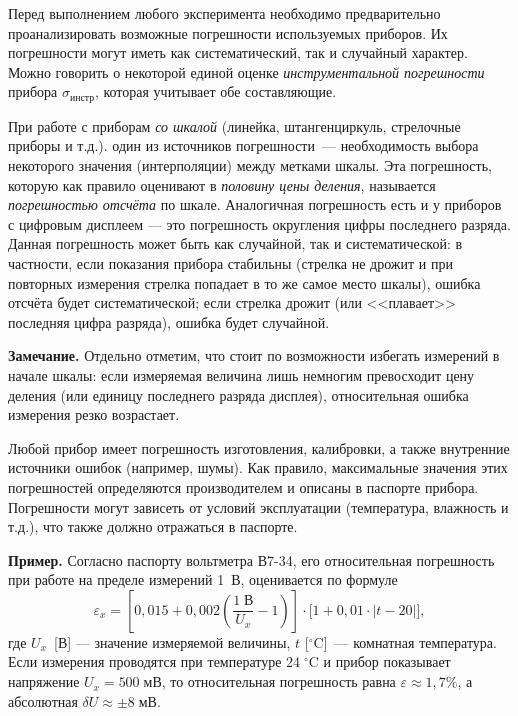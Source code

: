 Перед выполнением любого эксперимента необходимо предварительно проанализировать
возможные погрешности используемых приборов. Их погрешности могут
иметь как систематический, так и случайный характер. Можно говорить
о некоторой единой оценке \emph{инструментальной погрешности} прибора
$\sigma_{\text{инстр}}$, которая учитывает обе составляющие.

При работе с приборам \emph{со шкалой} (линейка, штангенциркуль, стрелочные
приборы и т.д.). один из источников погрешности~--- необходимость
выбора некоторого значения (интерполяции) между метками шкалы. Эта
погрешность, которую как правило оценивают в \emph{половину цены деления},
называется\emph{ погрешностью отсчёта} по шкале. Аналогичная погрешность
есть и у приборов с цифровым дисплеем --- это погрешность
округления цифры последнего разряда. Данная погрешность может быть
как случайной, так и систематической: в частности, если показания
прибора стабильны (стрелка не дрожит и при повторных измерения стрелка
попадает в то же самое место шкалы), ошибка отсчёта будет систематической;
если стрелка дрожит (или <<плавает>> последняя
цифра разряда), ошибка будет случайной. 

{\footnotesize
\textbf{Замечание.} Отдельно отметим, что стоит по
возможности избегать измерений в начале шкалы: если измеряемая величина
лишь немногим превосходит цену деления (или единицу последнего разряда
дисплея), относительная ошибка измерения резко возрастает.\par
}%


Любой прибор имеет погрешность изготовления, калибровки, а также внутренние
источники ошибок (например, шумы). Как правило, максимальные значения
этих погрешностей определяются производителем и описаны в паспорте
прибора. Погрешности могут зависеть от условий эксплуатации (температура,
влажность и т.д.), что также должно отражаться в паспорте. 

{\footnotesize
\textbf{Пример.} Согласно паспорту
вольтметра В7-34, его относительная погрешность при работе на пределе
измерений 1~В, оценивается по формуле 
\[
\varepsilon_{x}=\left[0{,}015+0{,}002\left(\frac{1\;\text{В}}{U_{x}}-1\right)\right]\cdot\bigr[1+0{,}01\cdot|t-20|\bigl],
\]
где $U_{x}$~{[}В{]} --- значение измеряемой величины,
$t$ {[}$^{\circ}\mathrm{C}${]}~--- комнатная температура.
Если измерения проводятся при температуре $24\;^{\circ}\mathrm{C}$
и прибор показывает напряжение $U_{x}=500\;\text{мВ}$, то относительная
погрешность равна $\varepsilon\approx1{,}7\%$, а абсолютная $\delta U\approx\pm8\;\text{мВ}.$\par
}%

